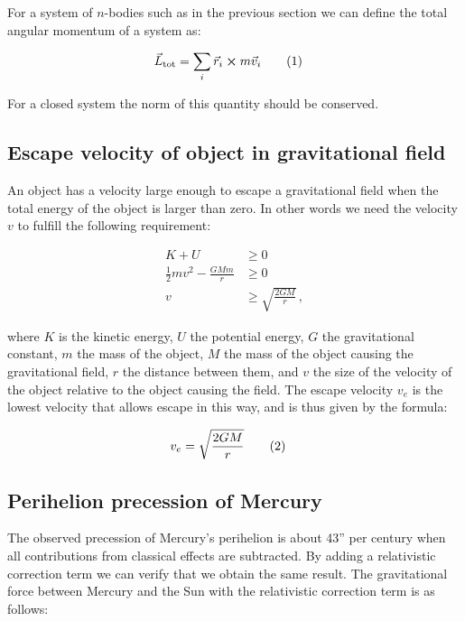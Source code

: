 \documentclass[reprint,english,notitlepage]{revtex4-1}  %
\newcommand\numberthis{\addtocounter{equation}{1}\tag{\theequation}}
\begin{document}
For a system of $n$-bodies such as in the previous section we can define the total angular momentum of a system as:

\begin{align*}
\vec{L}_\text{tot} &= \sum\limits_i \vec{r}_i \cross m\vec{v}_i \numberthis \label{eq:tot_ang_mom}
\end{align*}

For a closed system the norm of this quantity should be conserved.

\subsection{Escape velocity of object in gravitational field} \label{sec:II:d}

An object has a velocity large enough to escape a gravitational field when the total energy of the object is larger than zero. In other words we need the velocity $v$ to fulfill the following requirement:

\begin{align*}
K + U &\geq 0 \\
\frac{1}{2}mv^2 - \frac{GMm}{r} &\geq 0 \\
v &\geq \sqrt{\frac{2GM}{r}} \, ,
\end{align*}

where $K$ is the kinetic energy, $U$ the potential energy, $G$ the gravitational constant, $m$ the mass of the object, $M$ the mass of the object causing the gravitational field, $r$ the distance between them, and $v$ the size of the velocity of the object relative to the object causing the field. The escape velocity $v_e$ is the lowest velocity that allows escape in this way, and is thus given by the formula:

\begin{align*}
v_e &= \sqrt{\frac{2GM}{r}} \numberthis \label{eq:esc_vel}
\end{align*} 

\subsection{Perihelion precession of Mercury} \label{sec:II:e}

The observed precession of Mercury's perihelion is about 43'' per century when all contributions from classical effects are subtracted. By adding a relativistic correction term we can verify that we obtain the same result. The gravitational force between Mercury and the Sun with the relativistic correction term is as follows:
\end{document}
